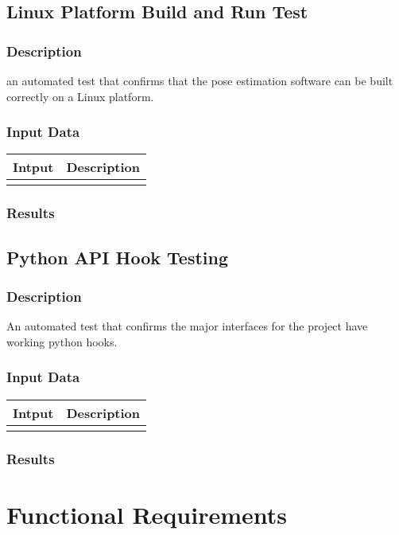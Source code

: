 \documentclass{scrreprt}
\begin{document}
\subsection{Linux Platform Build and Run Test}
\subsubsection{Description}
an automated test that confirms that the pose estimation software can be built correctly on a Linux platform.
\subsubsection{Input Data}
 \centering
 \begin{tabular}{p{3cm}p{6cm}}
 \hline\hline
 Intput & Description\\
 \hline\hline
   &  \\ %
 \hline
 \end{tabular}
\subsubsection{Results}

\subsection{Python API Hook Testing}
\subsubsection{Description}
An automated test that confirms the major interfaces for the project have working python hooks.
\subsubsection{Input Data}
 \centering
 \begin{tabular}{p{3cm}p{6cm}}
 \hline\hline
 Intput & Description\\
 \hline\hline
   &  \\ %
 \hline
 \end{tabular}
\subsubsection{Results}

\section{Functional Requirements}
\end{document}
